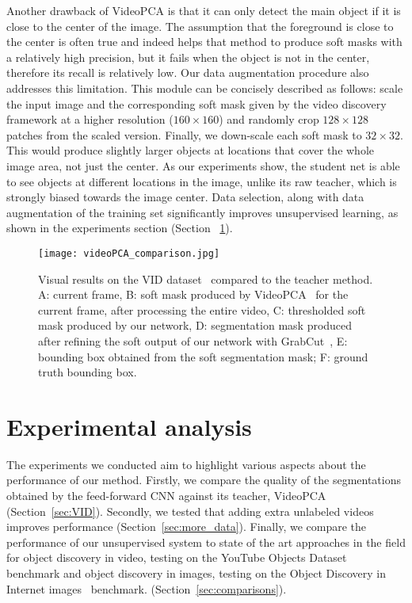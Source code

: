 \documentclass[10pt,twocolumn,letterpaper]{article}
\begin{document}
Another drawback of VideoPCA is that it can only detect the main object if it is close to the center of the image. The assumption that the foreground is close to the center is often true and indeed helps that method to produce soft masks with a relatively high precision, but it fails when the object is not in the center, therefore its recall is relatively low.
Our data augmentation procedure also addresses this limitation. This module can be concisely described as follows: scale the input image and the corresponding soft mask given by the video discovery framework at a higher resolution ($160\times160$) and randomly crop $128\times128$ patches from the scaled version. Finally, we down-scale each soft mask to $32\times32$. This would produce slightly larger objects at locations that cover the whole image area, not just the center. As our experiments show, the student net is able to see objects at different locations in the image, unlike its raw teacher, which is strongly biased towards the image center.
Data selection, along with data augmentation of the training set significantly improves unsupervised learning, as shown in the experiments section (Section ~\ref{sec:experiments}).


\begin{figure*}
\begin{center}
   \texttt{[image: videoPCA\_comparison.jpg]}
\end{center}
   \caption{Visual results on the VID dataset~\cite{russakovsky2015imagenet} compared to the teacher method.
A: current frame, B: soft mask produced by VideoPCA~\cite{stretcu2015multiple} for the current frame, after processing the entire video, C: thresholded soft mask produced by our network, D: segmentation mask produced after refining the soft output of our network with GrabCut~\cite{rother2004grabcut}, E: bounding box obtained from the soft segmentation mask; F: ground truth bounding box.}
\label{fig:vid_visual}
\end{figure*}

\section{Experimental analysis}
\label{sec:experiments}

The experiments we conducted aim to highlight various aspects about the performance of our method. Firstly, we compare the quality of the segmentations obtained by the feed-forward CNN against its teacher, VideoPCA (Section~\ref{sec:VID}).
Secondly, we tested that adding extra unlabeled videos improves performance (Section~\ref{sec:more_data}). Finally, we compare the performance of our unsupervised system to state of the art approaches in the field for object discovery in video, testing on the YouTube Objects Dataset~\cite{prest2012learning} benchmark and object discovery in images, testing on the Object Discovery in Internet images~\cite{rubinstein2013unsupervised} benchmark.
(Section~\ref{sec:comparisons}). 
\end{document}
